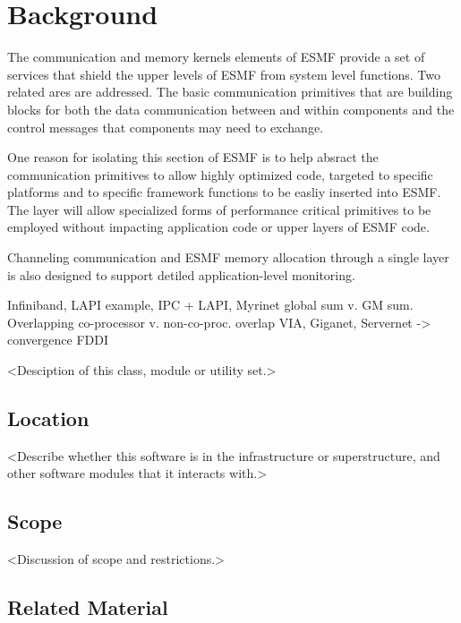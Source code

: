 
\section{Background}

The communication and memory kernels elements of ESMF provide a set of
services that shield the upper levels of ESMF from system
level functions. Two related ares are addressed. The basic communication
primitives that are building blocks for both the 
data communication between and within components and the
control messages that components may need to exchange.


One reason for isolating this section of ESMF is to help
absract the communication primitives to allow highly optimized code,
targeted to specific platforms and to specific framework functions
to be easliy inserted into ESMF. The {\bf \shortname}
layer will allow specialized forms of performance critical
primitives to be employed without impacting application
code or upper layers of ESMF code.

Channeling communication and ESMF memory allocation through a single 
layer is also designed to support detiled application-level 
monitoring.

Infiniband, LAPI example, IPC + LAPI, Myrinet global sum v.
GM sum. Overlapping co-processor v. non-co-proc. overlap
VIA, Giganet, Servernet -> convergence
FDDI



<Desciption of this class, module or utility set.>

\subsection{Location}

<Describe whether this software is in the infrastructure or superstructure,
and other software modules that it interacts with.>

\subsection{Scope}

<Discussion of scope and restrictions.>

\subsection{Related Material}




